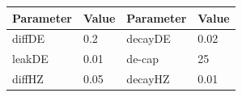 \begin{table}
  \centering\footnotesize
  \setlength{\tabcolsep}{5pt}\renewcommand{\arraystretch}{1.05}
  
  
  \begin{tabular}{@{}ll ll@{}}
    \toprule
    \textbf{Parameter} & \textbf{Value} & \textbf{Parameter} & \textbf{Value} \\
    \midrule
    diffDE  & 0.2  & decayDE & 0.02 \\
    leakDE  & 0.01 & de-cap  & 25   \\
    diffHZ  & 0.05 & decayHZ & 0.01 \\
    \bottomrule
  \end{tabular}
\end{table}
